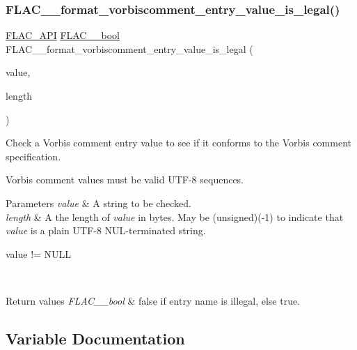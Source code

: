\subsubsection{\texorpdfstring{F\+L\+A\+C\+\_\+\+\_\+format\+\_\+vorbiscomment\+\_\+entry\+\_\+value\+\_\+is\+\_\+legal()}{FLAC\_\_format\_vorbiscomment\_entry\_value\_is\_legal()}}
{\footnotesize\ttfamily \hyperlink{group__flac__export_ga56ca07df8a23310707732b1c0007d6f5}{F\+L\+A\+C\+\_\+\+A\+PI} \hyperlink{ordinals_8h_a95103469f1cbd78b8cf250194985b34e}{F\+L\+A\+C\+\_\+\+\_\+bool} F\+L\+A\+C\+\_\+\+\_\+format\+\_\+vorbiscomment\+\_\+entry\+\_\+value\+\_\+is\+\_\+legal (\begin{DoxyParamCaption}\item[{\hyperlink{zconf_8h_a2c212835823e3c54a8ab6d95c652660e}{const} \hyperlink{ordinals_8h_a5eb569b12d5b047cdacada4d57924ee3}{F\+L\+A\+C\+\_\+\+\_\+byte} $\ast$}]{value,  }\item[{unsigned}]{length }\end{DoxyParamCaption})}

Check a Vorbis comment entry value to see if it conforms to the Vorbis comment specification.

Vorbis comment values must be valid U\+T\+F-\/8 sequences.


\begin{DoxyParams}{Parameters}
{\em value} & A string to be checked. \\
\hline
{\em length} & A the length of {\itshape value} in bytes. May be {\ttfamily }(unsigned)(-\/1) to indicate that {\itshape value} is a plain U\+T\+F-\/8 N\+U\+L-\/terminated string.  
\begin{DoxyCode}
value != NULL 
\end{DoxyCode}
 \\
\hline
\end{DoxyParams}

\begin{DoxyRetVals}{Return values}
{\em F\+L\+A\+C\+\_\+\+\_\+bool} & {\ttfamily false} if entry name is illegal, else {\ttfamily true}. \\
\hline
\end{DoxyRetVals}


\subsection{Variable Documentation}
\mbox{\label{group__flac__format_ga56e0484fe205ab9f699ba5413c8441a1}} 
